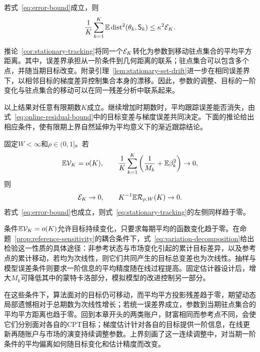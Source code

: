 \begin{corollary}[移动驻点集合的跟踪]\label{cor:stationary-tracking}
若式~\eqref{eq:error-bound}成立，则
\begin{equation}\label{eq:stationary-tracking}
 \frac1K\sum_{k=1}^{K}
 \mathbb E\operatorname{dist}^2(\theta_k,\mathsf S_k)
 \le\kappa^2\mathcal E_K.
\end{equation}
\end{corollary}

推论~\ref{cor:stationary-tracking}将同一个$\mathcal E_K$转化为参数到移动驻点集合的平均平方距离。其中，误差界承担从一阶条件到几何距离的联系；驻点集合可以包含多个点，并随当期目标改变。附录引理~\ref{lem:stationary-set-drift}进一步在相同误差界下，以相邻目标的梯度差异控制集合本身的漂移。因此，参数的调整、目标的一阶变化与驻点集合的移动可以在同一残差分析中联系起来。

以上结果对任意有限期数$K$成立。继续增加时期数时，平均跟踪误差能否消失，由式~\eqref{eq:online-residual-bound}中的目标变差与梯度误差共同决定。下面的推论给出相应条件，使有限期上界自然延伸为平均意义下的渐近跟踪结论。

\begin{corollary}[平均平方投影残差与动态局部遗憾趋于零]\label{cor:vanishing-tracking}
固定$W<\infty$和$\rho\in(0,1]$。若
\begin{equation}\label{eq:vanishing-conditions}
 \mathbb E\mathcal V_K=o(K),
 \qquad
 \frac1K\sum_{k=1}^{K}
 \left(\frac1{M_k}+\mathbb E\beta_k^2\right)\to0,
\end{equation}
则
\begin{equation}\label{eq:vanishing-conclusion}
 \mathcal E_K\to0,
 \qquad
 K^{-1}\mathbb E\mathcal R_{\rho,W}(K)\to0.
\end{equation}
若式~\eqref{eq:error-bound}也成立，则式~\eqref{eq:stationary-tracking}的左侧同样趋于零。
\end{corollary}

条件$\mathbb E\mathcal V_K=o(K)$允许目标持续变化，只要求每期平均的函数变化趋于零。在命题~\ref{prop:reference-sensitivity}的耦合条件下，式~\eqref{eq:variation-decomposition}给出检验这一性质的具体途径：非参考状态与市场变化引起的累计目标差异，以及参考点的累计移动，若均为次线性，则它们共同产生的目标总变差也为次线性。抽样与模型误差条件则要求一阶信息的平均精度随在线过程提高。固定估计器设计后，增大$M_k$可降低其中的蒙特卡洛部分，模拟模型的改进控制另一部分。

在这些条件下，算法面对的目标仍可移动，而平均平方投影残差趋于零，期望动态局部遗憾相对于总期数为次线性增长；若统一误差界成立，参数到当期驻点集合的平均平方距离也趋于零。回到本章开头的两类账户，财富相同而参考点不同，会使它们分别面对各自的CPT目标；梯度估计针对各自的目标提供一阶信息，在线更新再随账户与市场的演变持续调整参数。上界刻画了这一连续调整中，对当期一阶条件的平均偏离如何随目标变化和估计精度而改变。
